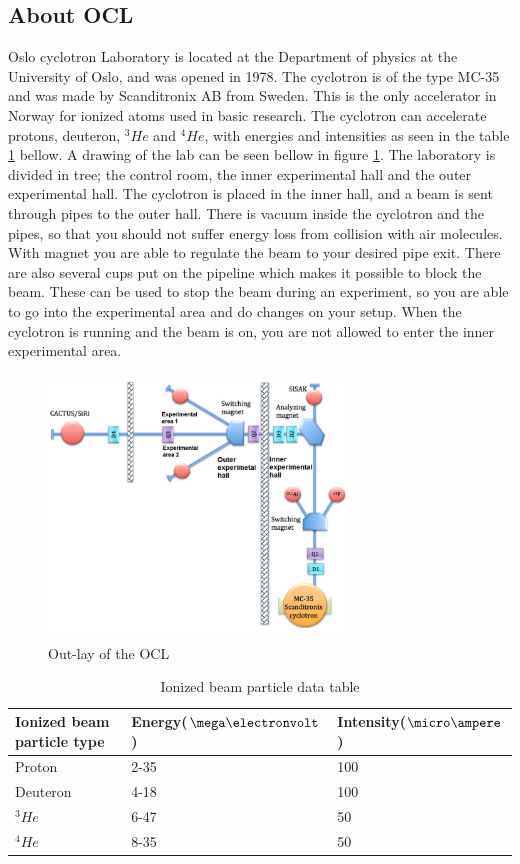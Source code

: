 \documentclass[12pt]{article}
\numberwithin{figure}{section}
\begin{document}
\subsection{About \ac{OCL}}
Oslo cyclotron Laboratory is located at the Department of physics at the University of Oslo, and was opened in 1978. The cyclotron is of the type MC-35 and was made by Scanditronix AB from Sweden.
This is the only accelerator in Norway for ionized atoms used in basic research.
The cyclotron can accelerate protons, deuteron, $^3He$ and $^4He$, 
with energies and intensities as seen in the table \ref{design requirements} bellow.
A drawing of the lab can be seen bellow in figure \ref{OCL_fig}. 
The laboratory is divided in tree; the control room, the inner experimental hall and the outer experimental hall.
The cyclotron is placed in the inner hall, and a beam is sent through pipes to the outer hall.
There is vacuum inside the cyclotron and the pipes, so that you should not suffer energy loss from collision with air molecules.
With magnet you are able to regulate the beam to your desired pipe exit.
There are also several cups put on the pipeline which makes it possible to block the beam.
These can be used to stop the beam during an experiment, so you are able to go into the experimental area and do changes on your setup.
When the cyclotron is running and the beam is on, you are not allowed to enter the inner experimental area.
 
\begin{figure}[!htbp]
\centering
\centerline{\includegraphics[height=7cm,width=8cm]{OCL.png}}
\caption{Out-lay of the OCL}
\label{OCL_fig}
\end{figure}


\begin{table}[!htbp]
 \centering
\begin{tabular}{|l|l|l|}\hline
Ionized beam particle type & Energy(${\mega\electronvolt}$) & Intensity($\micro\ampere$)  \\ \hline \hline
Proton & 2-35 & 100 \\ \hline
Deuteron & 4-18 & 100 \\ \hline
$^3He$ &  6-47 & 50 \\ \hline 
$^4He$  & 8-35 & 50 \\ \hline
\end{tabular}
\caption{Ionized beam particle data table}
\label{design requirements}
\end{table}
\end{document}

